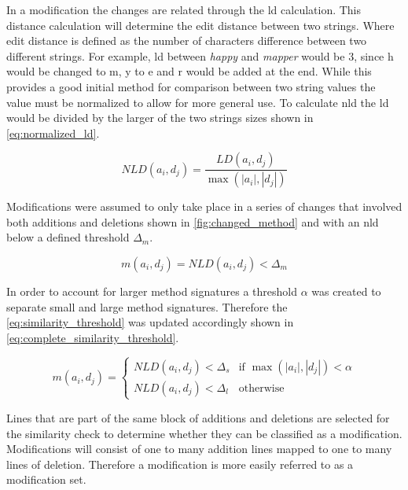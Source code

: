 In a modification the changes are related through the \gls{ld} calculation. This distance calculation will determine the edit distance between two strings. Where edit distance is defined as the number of characters difference between two different strings. For example, \gls{ld} between \textit{happy} and \textit{mapper} would be 3, since h would be changed to m, y to e and r would be added at the end. While this provides a good initial method for comparison between two string values the value must be normalized to allow for more general use. To calculate \gls{nld} the \gls{ld} would be divided by the larger of the two strings sizes shown in \autoref{eq:normalized_ld}.


\begin{equation}
\label{eq:normalized_ld}
NLD(a_i, d_j) = \frac{LD(a_i, d_j)}{\max(|a_i|,|d_j|)}
\end{equation}

Modifications were assumed to only take place in a series of changes that involved both additions and deletions shown in \autoref{fig:changed_method} and with an \gls{nld} below a defined threshold $\Delta_m$.

\begin{equation}
\label{eq:similarity_threshold}
m(a_i, d_j) = NLD(a_i, d_j) < \Delta_m
\end{equation}

In order to account for larger method signatures a threshold $\alpha$ was created to separate small and large method signatures. Therefore the \autoref{eq:similarity_threshold} was updated accordingly shown in \autoref{eq:complete_similarity_threshold}.

\begin{equation}
\label{eq:complete_similarity_threshold}
m(a_i, d_j) = \left\{\begin{matrix}
NLD(a_i, d_j) < \Delta_s & \text{if } \max(|a_i|, |d_j|) < \alpha \\ 
NLD(a_i, d_j) < \Delta_l & \text{otherwise}
\end{matrix}\right.
\end{equation}

Lines that are part of the same block of additions and deletions are selected for the similarity check to determine whether they can be classified as a modification. Modifications will consist of one to many addition lines mapped to one to many lines of deletion. Therefore a modification is more easily referred to as a modification set.

